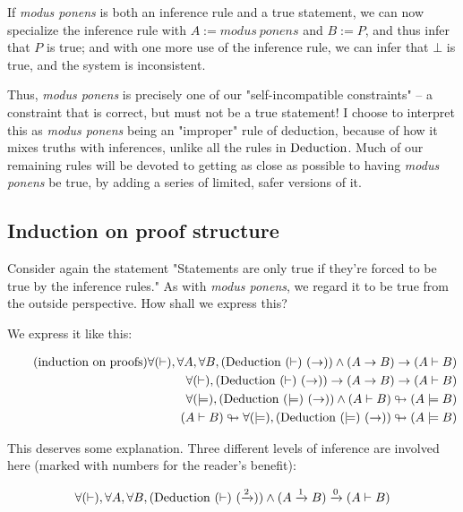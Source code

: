 \documentclass{article}
\begin{document}
  If \emph{modus ponens} is both an inference rule and a true statement, we can now specialize the inference rule with $A := modus\ ponens$ and $B := P$, and thus infer that $P$ is true; and with one more use of the inference rule, we can infer that $\bot$ is true, and the system is inconsistent.
  
  Thus, \emph{modus ponens} is precisely one of our "self-incompatible constraints" – a constraint that is correct, but must not be a true statement! I choose to interpret this as \emph{modus ponens} being an "improper" rule of deduction, because of how it mixes truths with inferences, unlike all the rules in $\operatorname{\mathrm{Deduction}}$. Much of our remaining rules will be devoted to getting as close as possible to having \emph{modus ponens} be true, by adding a series of limited, safer versions of it.
  
  
    
  
  \subsection{Induction on proof structure}
  
  Consider again the statement "Statements are only true if they're forced to be true by the inference rules." As with \emph{modus ponens}, we regard it to be true from the outside perspective. How shall we express this?
  
  We express it like this:
  
  \begin{align*}
    \tag{induction on proofs}\label{inp}
    \forall (\vdash), \forall A,\forall B,  (\deduction\ (\vdash)\ (\to)) \wedge (A \to B) \to (A \vdash B)\\
    \forall (\vdash), (\deduction\ (\vdash)\ (\to)) \to (A \to B) \to (A \vdash B)\\
    \forall (\models), (\deduction\ (\models)\ (\to)) \wedge (A \vdash B) \looparrowright (A \models B)\\
    (A \vdash B) \looparrowright \forall (\models), (\deduction\ (\models)\ (\to)) \looparrowright (A \models B)\\
  \end{align*}
  
  This deserves some explanation. Three different levels of inference are involved here (marked with numbers for the reader's benefit):
  
  \begin{align*}
    \forall (\vdash), \forall A,\forall B,  (\deduction\ (\vdash)\ (\implies{2})) \wedge (A \implies{1} B) \implies{0} (A \vdash B)\\
  \end{align*}
  
\end{document}
